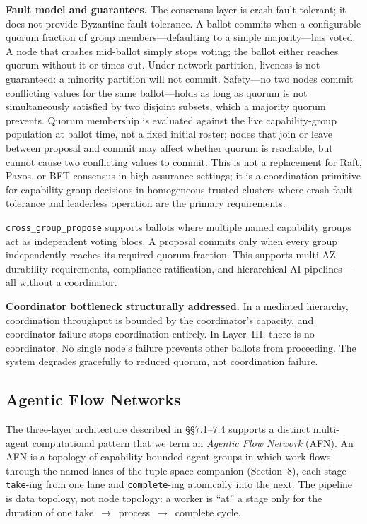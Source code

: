 \documentclass[11pt]{article}
\begin{document}
\textbf{Fault model and guarantees.} The consensus layer is crash-fault tolerant;
it does not provide Byzantine fault tolerance. A ballot commits when a configurable
quorum fraction of group members---defaulting to a simple majority---has voted. A
node that crashes mid-ballot simply stops voting; the ballot either reaches quorum
without it or times out. Under network partition, liveness is not guaranteed: a
minority partition will not commit. Safety---no two nodes commit conflicting values
for the same ballot---holds as long as quorum is not simultaneously satisfied by
two disjoint subsets, which a majority quorum prevents. Quorum membership is
evaluated against the live capability-group population at ballot time, not a fixed
initial roster; nodes that join or leave between proposal and commit may affect
whether quorum is reachable, but cannot cause two conflicting values to commit.
This is not a replacement for Raft, Paxos, or BFT consensus in high-assurance
settings; it is a coordination primitive for capability-group decisions in
homogeneous trusted clusters where crash-fault tolerance and leaderless operation
are the primary requirements.

\texttt{cross\_group\_propose} supports ballots where multiple named capability
groups act as independent voting blocs. A proposal commits only when every group
independently reaches its required quorum fraction. This supports multi-AZ
durability requirements, compliance ratification, and hierarchical AI pipelines---all
without a coordinator.

\textbf{Coordinator bottleneck structurally addressed.} In a mediated hierarchy,
coordination throughput is bounded by the coordinator's capacity, and coordinator
failure stops coordination entirely. In Layer~III, there is no coordinator. No
single node's failure prevents other ballots from proceeding. The system degrades
gracefully to reduced quorum, not coordination failure.

\subsection{Agentic Flow Networks}

The three-layer architecture described in \S\S7.1--7.4 supports a distinct
multi-agent computational pattern that we term an \emph{Agentic Flow Network}
(AFN). An AFN is a topology of capability-bounded agent groups in which work flows
through the named lanes of the tuple-space companion (Section~8), each stage
\texttt{take}-ing from one lane and \texttt{complete}-ing atomically into the
next. The pipeline is data topology, not node topology: a worker is ``at'' a
stage only for the duration of one take~$\to$~process~$\to$~complete cycle.
\end{document}
